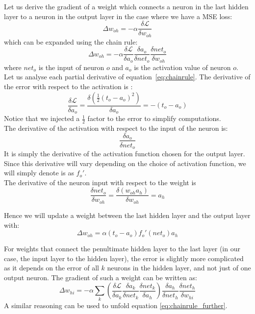 Let us derive the gradient of a weight which connects a neuron in the 
last hidden layer to a neuron in the output layer in the case
where we have a MSE loss:
$$ \Delta w_{oh} = -\alpha\frac{\delta\mathcal{L}}{\delta w_{oh}}$$
which can be expanded using the chain rule:
\begin{equation}
\Delta w_{oh} = -\alpha
\frac{\delta\mathcal{L}}{\delta a_o}
\frac{\delta a_o}{\delta net_o}
\frac{\delta net_o}{\delta w_{oh}}
	\label{eq:chainrule}
\end{equation}
where $net_o$ is the input of neuron $o$ and $a_o$ is the activation value
of neuron $o$.\\

Let us analyse each partial derivative of equation~\ref{eq:chainrule}.
The derivative of the error with respect to the activation is :
$$ \frac{\delta\mathcal{L}}{\delta a_o} = 
\frac{\delta(\frac{1}{2}(t_o-a_o)^2)}{\delta a_o} = -(t_o-a_o)$$
Notice that we injected a $\frac{1}{2}$ factor to the error to simplify 
computations.\\

The derivative of the activation with respect to the input of the neuron is:
$$ \frac{\delta a_o}{\delta net_o} $$
It is simply the derivative of the activation function chosen for
the output layer. Since this derivative will vary depending on the choice
of activation function, we will simply denote is as $f_o'$.\\


The derivative of the neuron input with respect to the weight is
$$ \frac{\delta net_o}{\delta w_{oh}} = \frac{\delta (w_{oh}a_h)}{\delta w_{oh}}
 = a_h$$

Hence we will update a weight between the last hidden layer and the output
layer with:
$$ \Delta w_{oh} = \alpha (t_o-a_o)f_o'(net_o)a_h$$

For weights that connect the penultimate hidden layer to the last layer (in
our case, the input layer to the hidden layer), the error is slightly more 
complicated as it depends on the error of all $k$ neurons in the hidden layer,
and not just of one output neuron. The gradient of such a weight can be
written as:
\begin{equation}
\Delta w_{hi} = -\alpha
	\sum\limits_k \left(
	\frac{\delta\mathcal{L}}{\delta a_k}
	\frac{\delta a_k}{\delta net_k}
	\frac{\delta net_k}{\delta a_h}
	\right)
\frac{\delta a_h}{\delta net_h}
\frac{\delta net_h}{\delta w_{hi}}
	\label{eq:chainrule_further}
\end{equation}
A similar reasoning can be used to unfold equation \ref{eq:chainrule_further}.\\

